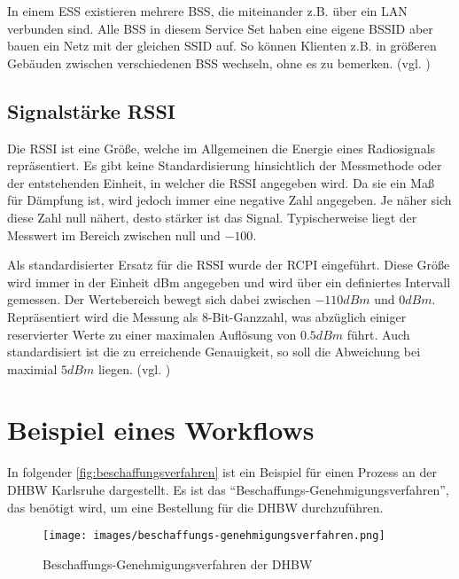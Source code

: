 In einem \gls{ESS} existieren mehrere \gls{BSS}, die miteinander z.B. über ein \gls{LAN} verbunden sind.
Alle \gls{BSS} in diesem Service Set haben eine eigene \gls{BSSID} aber bauen ein Netz mit der gleichen \gls{SSID} auf.
So können Klienten z.B. in größeren Gebäuden zwischen verschiedenen \gls{BSS} wechseln, ohne es zu bemerken.
(vgl. \cite{Haider2019})

\subsection{Signalstärke \gls{RSSI}}

Die \gls{RSSI} ist eine Größe, welche im Allgemeinen die Energie eines Radiosignals repräsentiert.
Es gibt keine Standardisierung hinsichtlich der Messmethode oder der entstehenden Einheit, in
welcher die \gls{RSSI} angegeben wird. Da sie ein Maß für Dämpfung ist, wird jedoch immer eine
negative Zahl angegeben. Je näher sich diese Zahl null nähert, desto stärker ist das Signal.
Typischerweise liegt der Messwert im Bereich zwischen null und $-100$.

Als standardisierter Ersatz für die \gls{RSSI} wurde der \gls{RCPI} eingeführt. Diese Größe wird
immer in der Einheit dBm angegeben und wird über ein definiertes Intervall gemessen. Der
Wertebereich bewegt sich dabei zwischen $-110 dBm$ und $0 dBm$. Repräsentiert wird die Messung als
8-Bit-Ganzzahl, was abzüglich einiger reservierter Werte zu einer maximalen Auflösung von $0.5 dBm$
führt. Auch standardisiert ist die zu erreichende Genauigkeit, so soll die Abweichung bei maximial
$5 dBm$ liegen. (vgl. \cite{IEEE802.11-2012})

\section{Beispiel eines Workflows}

In folgender \autoref{fig:beschaffungsverfahren} ist ein Beispiel für einen Prozess an der \gls{DHBW} Karlsruhe dargestellt.
Es ist das \enquote{Beschaffungs-Genehmigungsverfahren}, das benötigt wird, um eine Bestellung für die \gls{DHBW} durchzuführen.

\begin{figure}[h!tbp]
	\texttt{[image: images/beschaffungs-genehmigungsverfahren.png]}
	\centering
	\caption{Beschaffungs-Genehmigungsverfahren der \gls{DHBW}}
	\label{fig:beschaffungsverfahren}
\end{figure}


